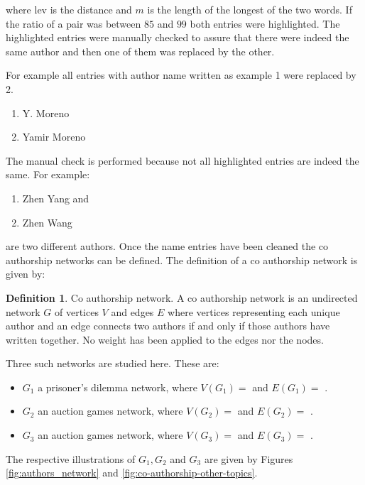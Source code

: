 \documentclass{article}
\theoremstyle{definition}
\newtheorem{definition}{Definition}[section]
\newcommand{\authors}{}
\newcommand{\edges}{}
\newcommand{\auctionauthors}{}
\newcommand{\auctionedges}{}
\newcommand{\priceauthors}{}
\newcommand{\priceedges}{}
\begin{document}
where \(\text{lev}\) is the distance and \(m\) is the length of the longest of
the two words. If the ratio of a pair was between \(85\) and \(99\) both entries
were highlighted. The highlighted entries were manually checked to assure that
there were indeed the same author and then one of them was replaced by the other.

For example all entries with author name written as example 1 were replaced by
2.

\begin{enumerate}
    \item Y. Moreno
    \item Yamir Moreno
\end{enumerate}

The manual check is performed because not all highlighted entries are indeed the
same. For example:

\begin{enumerate}
    \item Zhen Yang and
    \item Zhen Wang
\end{enumerate}

are two different authors. Once the name entries have been cleaned the
co authorship networks can be defined. The definition of a co authorship network
is given by:

\begin{definition}{Co authorship network.}
    A co authorship network is an undirected network \(G\) of vertices \(V\) and
    edges \(E\) where vertices representing each unique author and an edge
    connects two authors if and only if those authors have written together.
    No weight has been applied to the edges nor the nodes.
\end{definition}

Three such networks are studied here. These are:

\begin{itemize}
    \item \(G_1\) a prisoner's dilemma network, where \(V(G_1)=\) \authors and
    \(E(G_1)=\) \edges.
    \item \(G_2\) an auction games network, where \(V(G_2)=\) \auctionauthors and
    \(E(G_2)=\) \auctionedges.
    \item \(G_3\) an auction games network, where \(V(G_3)=\) \priceauthors and
    \(E(G_3)=\) \priceedges.
\end{itemize}

The respective illustrations of \(G_1, G_2\) and \(G_3\) are given by Figures
\ref{fig:authors_network} and \ref{fig:co-authorship-other-topics}.
\end{document}
